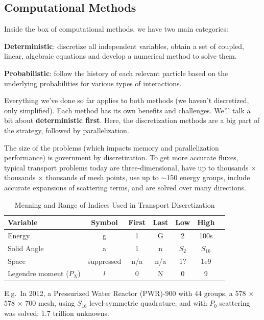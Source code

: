 \documentclass[12pt]{article}
\begin{document}
\subsection*{Computational Methods}
Inside the box of computational methods, we have two main categories: 
\begin{compactitem}
\item \textbf{Deterministic}: discretize all independent variables, obtain a set of coupled, linear, algebraic equations and develop a numerical method to solve them.
\item \textbf{Probabilistic}: follow the history of each relevant particle based on the underlying probabilities for various types of interactions.
\end{compactitem}
%
Everything we've done so far applies to both methods (we haven't discretized, only simplified). Each method has its own benefits and challenges. We'll talk a bit about \textbf{deterministic first}. Here, the discretization methods are a big part of the strategy, followed by parallelization.

The size of the problems (which impacts memory and parallelization performance) is government by discretization. To get more accurate fluxes, typical transport problems today are three-dimensional, have up to thousands $\times$ thousands $\times$ thousands of mesh points, use up to $\sim$150 energy groups, include accurate expansions of scattering terms, and are solved over many directions. 
%
\begin{table}[!h]
\caption{Meaning and Range of Indices Used in Transport Discretization}
\begin{center}
\begin{tabular}{l c c c c c c}
\hline
Variable & Symbol & First & Last & Low & High \\[0.5ex]
\hline
Energy & g & 1 & G & 2 & 100s \\
Solid Angle & a & 1 & n & $S_2$ & $S_{16}$ \\
Space & suppressed & n/a & n/a & 1? & 1e9 \\
Legendre moment ($P_{N}$) & $l$ & 0 & N & 0 & 9 \\
\hline
\end{tabular}
\end{center}
\label{table:index}
\end{table}
%
E.g.\ In 2012, a Pressurized Water Reactor (PWR)-900 with 44 groups, a 578 $\times$ 578 $\times$ 700 mesh, using $S_{16}$ level-symmetric quadrature, and with $P_{0}$ scattering was solved: 1.7 trillion unknowns.
\end{document}

